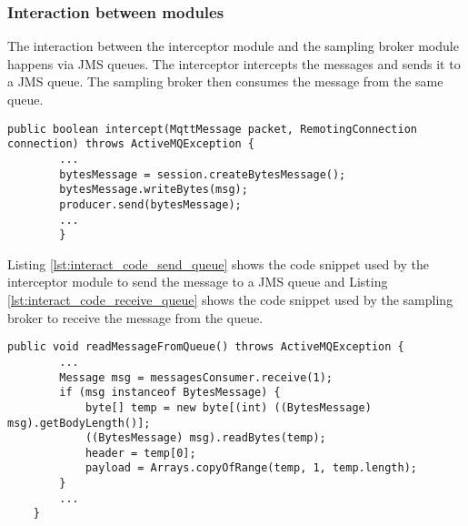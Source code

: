 \subsubsection{Interaction between modules} \label{subsubsection:interact}

The interaction between the interceptor module and the sampling broker module happens via JMS queues. The interceptor intercepts the messages and sends it to a JMS queue. The sampling broker then consumes the message from the same queue. 

\bigskip
\begin{lstlisting}[style=JavaInputStyle,caption=Interceptor sending message to JMS queue, label={lst:interact_code_send_queue}]
	public boolean intercept(MqttMessage packet, RemotingConnection connection) throws ActiveMQException {
		...
		bytesMessage = session.createBytesMessage();
		bytesMessage.writeBytes(msg);
		producer.send(bytesMessage);
		...
	    }
\end{lstlisting}

Listing \ref{lst:interact_code_send_queue} shows the code snippet used by the interceptor module to send the message to a JMS queue and Listing \ref{lst:interact_code_receive_queue} shows the code snippet used by the sampling broker to receive the message from the queue.

\bigskip
\begin{lstlisting}[style=JavaInputStyle,caption=Sampling Broker receiving message from \\ JMS queue, label={lst:interact_code_receive_queue}]
public void readMessageFromQueue() throws ActiveMQException {
        ...
        Message msg = messagesConsumer.receive(1);
        if (msg instanceof BytesMessage) {
            byte[] temp = new byte[(int) ((BytesMessage) msg).getBodyLength()];
            ((BytesMessage) msg).readBytes(temp);
            header = temp[0];
            payload = Arrays.copyOfRange(temp, 1, temp.length);
        }
        ...
    }
\end{lstlisting}

